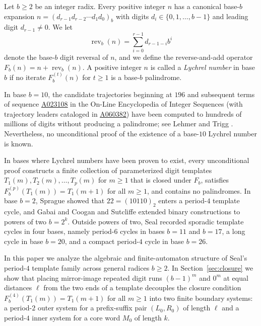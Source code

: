 \documentclass[12pt,reqno]{article}
\newcommand{\seqnum}[1]{\href{https://oeis.org/#1}{\rm \underline{#1}}}
\DeclareMathOperator{\Rev}{rev}
\begin{document}
Let $b \geq 2$ be an integer radix. Every positive integer $n$ has a canonical base-$b$ expansion $n = (d_{r-1} d_{r-2} \cdots d_1 d_0)_b$ with digits $d_i \in \{0, 1, \ldots, b-1\}$ and leading digit $d_{r-1} \neq 0$. We let
\begin{displaymath}
\Rev_b(n) = \sum_{i=0}^{r-1} d_{r-1-i} b^i
\end{displaymath}
denote the base-$b$ digit reversal of $n$, and we define the reverse-and-add operator $F_b(n) = n + \Rev_b(n)$. A positive integer $n$ is called a \emph{Lychrel number} in base $b$ if no iterate $F_b^{(t)}(n)$ for $t \geq 1$ is a base-$b$ palindrome.

In base $b = 10$, the candidate trajectories beginning at $196$ and subsequent terms of sequence \seqnum{A023108} in the On-Line Encyclopedia of Integer Sequences \cite{oeis} (with trajectory leaders cataloged in \seqnum{A060382}) have been computed to hundreds of millions of digits without producing a palindrome; see Lehmer \cite{lehmer1938} and Trigg \cite{trigg1967}. Nevertheless, no unconditional proof of the existence of a base-$10$ Lychrel number is known.

In bases where Lychrel numbers have been proven to exist, every unconditional proof constructs a finite collection of parameterized digit templates $T_1(m), T_2(m), \ldots, T_p(m)$ for $m \geq 1$ that is closed under $F_b$, satisfies $F_b^{(p)}(T_1(m)) = T_1(m+1)$ for all $m \geq 1$, and contains no palindromes. In base $b = 2$, Sprague \cite{sprague1960} showed that $22 = (10110)_2$ enters a period-$4$ template cycle, and Gabai and Coogan \cite{gabai1969} and Sutcliffe \cite{sutcliffe1968} extended binary constructions to powers of two $b = 2^k$. Outside powers of two, Seal \cite{seal1996} recorded sporadic template cycles in four bases, namely period-$6$ cycles in bases $b = 11$ and $b = 17$, a long cycle in base $b = 20$, and a compact period-$4$ cycle in base $b = 26$.

In this paper we analyze the algebraic and finite-automaton structure of Seal's period-$4$ template family across general radices $b \geq 2$. In Section~\ref{sec:closure} we show that placing mirror-image repeated digit runs $(b-1)^m$ and $0^m$ at equal distances $\ell$ from the two ends of a template decouples the closure condition $F_b^{(4)}(T_1(m)) = T_1(m+1)$ for all $m \geq 1$ into two finite boundary systems: a period-$2$ outer system for a prefix-suffix pair $(L_0, R_0)$ of length $\ell$ and a period-$4$ inner system for a core word $M_0$ of length $k$.
\end{document}
